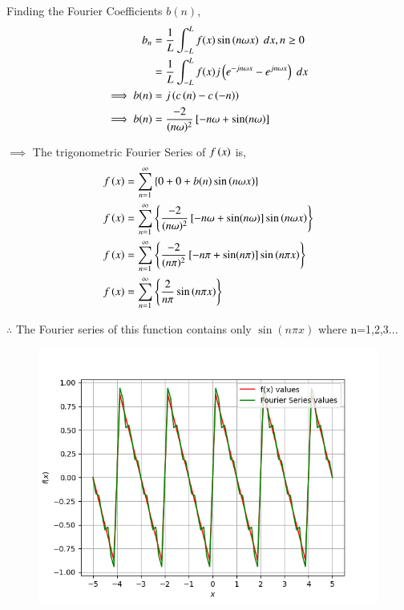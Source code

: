 \documentclass[journal,12pt,onecolumn]{IEEEtran}
\theoremstyle{remark}
\begin{document}
Finding the Fourier Coefficients $b(n)$,
\begin{align}
    b_n&=\frac{1}{L}\int_{-L}^{L}f(x)\sin\left(n\omega x\right)\;dx, n \geq 0 \\
    &= \frac{1}{L}\int_{-L}^{L}f(x)j\left(e^{-jn\omega x}-e^{jn\omega x}\right) \; dx \\
   \implies b(n) &= j\left(c\left(n\right) - c\left(-n\right)\right) \\
   \implies b(n)&= \frac{-2}{(n\omega )^2}{}\left[-n\omega +  \sin(n\omega)\right] 
\end{align}  

$\implies$ The trigonometric Fourier Series of $f\left(x\right)$ is,
\begin{align}
 f\left(x\right) &=\sum_{n=1}^{\infty}\left\{0+ 0 +b(n)\sin\left(n\omega x\right)\right\} \\
 f\left(x\right) &=\sum_{n=1}^{\infty}\left\{\frac{-2}{(n\omega )^2}{}\left[-n\omega +  \sin(n\omega)\right] \sin\left(n\omega x\right)\right\} \\
 f\left(x\right) &=\sum_{n=1}^{\infty}\left\{\frac{-2}{(n\pi )^2}{}\left[-n\pi +  \sin(n\pi)\right] \sin\left(n\pi x\right)\right\} \\
  f\left(x\right) &=\sum_{n=1}^{\infty}\left\{\frac{2}{n\pi } \sin\left(n\pi x\right)\right\}
 \end{align}

 $\therefore$ The Fourier series of this function contains only $\sin(n\pi x)$ where n=1,2,3...
 
 \begin{figure}[!ht]
    \centering
     \includegraphics[width=\columnwidth]{2022/IN/13/figs/f.png}
    \caption{}    
    \label{fig:ishitha.g22.in.13.f1}
\end{figure}
 

\end{document}
